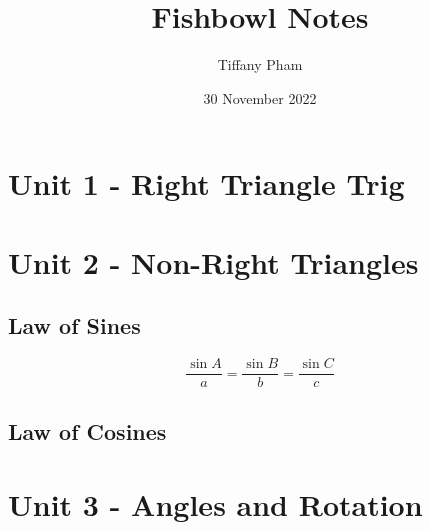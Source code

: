 \documentclass{article}
\title{Fishbowl Notes}
\author{Tiffany Pham}
\date{30 November 2022}
\begin{document}
\maketitle

\section*{Unit 1 - Right Triangle Trig}

\section*{Unit 2 - Non-Right Triangles}
\subsection{Law of Sines}
\begin{displaymath}
    \frac{{\sin A}}{a} = \frac{{\sin B}}{b} = \frac{{\sin C}}{c}
\end{displaymath}


\subsection{Law of Cosines}


\section*{Unit 3 - Angles and Rotation}
\end{document}
